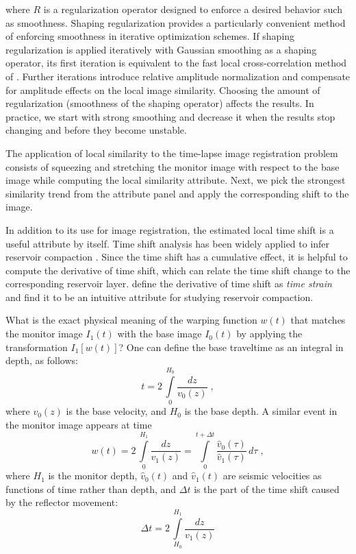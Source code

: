 where $R$ is a regularization operator designed to enforce a desired
behavior such as smoothness. Shaping regularization \cite[]{shape}
provides a particularly convenient method of enforcing smoothness in
iterative optimization schemes. If shaping regularization is applied
iteratively with Gaussian smoothing as a shaping operator, its first
iteration is equivalent to the fast local cross-correlation method of
\cite{hale}. Further iterations introduce relative amplitude
normalization and compensate for amplitude effects on the local image
similarity.  Choosing the amount of regularization (smoothness of the
shaping operator) affects the results.  In practice, we start with
strong smoothing and decrease it when the results stop changing and
before they become unstable.

The application of local similarity to the time-lapse image
registration problem consists of squeezing and stretching the monitor
image with respect to the base image while computing the local
similarity attribute. Next, we pick the strongest similarity trend
from the attribute panel and apply the corresponding shift to the image.

In addition to its use for image registration, the estimated local
time shift is a useful attribute by itself. Time shift analysis has
been widely applied to infer reservoir compaction
\cite[]{hatchell,tura,janssen,rickett}. Since the time shift has a
cumulative effect, it is helpful to compute the derivative of time
shift, which can relate the time shift change to the corresponding
reservoir layer. \cite{rickett} define the derivative of time shift
as \emph{time strain} and find it to be an
intuitive attribute for studying reservoir
compaction.

What is the exact physical meaning of the warping function $w(t)$ that
matches the monitor image $I_1(t)$ with the
base image $I_0(t)$ by applying the
transformation $I_1[w(t)]$? One can define the 
base traveltime as an integral in depth, as follows:
\begin{equation}
\label{eq:t0}
t = 2\,\int\limits_0^{H_0} \frac{dz}{v_0(z)}\;,
\end{equation} 
where $v_0(z)$ is the base velocity, and $H_0$
is the base depth. A similar event in the
monitor image appears at time
\begin{equation}
\label{eq:t1}
w(t) = 2\,\int\limits_0^{H_1} \frac{dz}{v_1(z)} = \int\limits_0^{t+\Delta t} \frac{\hat{v}_0(\tau)}{\hat{v}_1(\tau)}\,d\tau\;,
\end{equation} 
where $H_1$ is the monitor depth, $\hat{v}_0(t)$ and $\hat{v}_1(t)$
are seismic velocities as functions of time rather than depth, and
$\Delta t$ is the part of the time shift caused by the reflector
  movement:
\begin{equation}
\label{eq:dt}
\Delta t = 2\,\int\limits_{H_0}^{H_1} \frac{dz}{v_1(z)}
\end{equation}
 
